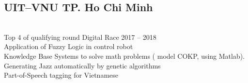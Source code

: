 \documentclass[]{plushcv}
\begin{document}
\begin{minipage}[t]{0.25\textwidth}
\subsection{UIT–VNU TP. Ho Chi
Minh}
\vspace{0.5cm}
\\
\textbullet Top 4 of qualifying round Digital Race 2017 – 2018\\
\textbullet Application of Fuzzy Logic in control robot\\
\textbullet Knowledge Base Systems to solve math problems ( model
COKP, using Matlab).\\
\textbullet Generating Jazz automatically by genetic algorithms\\
\textbullet Part-of-Speech tagging for Vietnamese\\






\end{minipage} 
\end{document}
